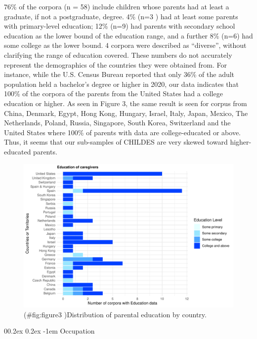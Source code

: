 \documentclass[
  man,floatsintext]{apa6}
\makeatletter
\let\oldparagraph\paragraph
\renewcommand{\paragraph}[1]{\oldparagraph{#1}\mbox{}}
\renewcommand{\paragraph}{\@startsection{paragraph}{4}{\parindent}%
  {0\baselineskip \@plus 0.2ex \@minus 0.2ex}%
  {-1em}%
  {\normalfont\normalsize\bfseries\itshape\typesectitle}}
\makeatother
\begin{document}
76\% of the corpora (n = 58) include children whose parents had at least a graduate, if not a postgraduate, degree. 4\% (n=3 ) had at least some parents with primary-level education; 12\% (n=9) had parents with secondary school education as the lower bound of the education range, and a further 8\% (n=6) had some college as the lower bound. 4 corpora were described as ``diverse'', without clarifying the range of education covered. These numbers do not accurately represent the demographics of the countries they were obtained from. For instance, while the U.S. Census Bureau reported that only 36\% of the adult population held a bachelor's degree or higher in 2020, our data indicates that 100\% of the corpora of the parents from the United States had a college education or higher. As seen in Figure 3, the same result is seen for corpus from China, Denmark, Egypt, Hong Kong, Hungary, Israel, Italy, Japan, Mexico, The Netherlands, Poland, Russia, Singapore, South Korea, Switzerland and the United States where 100\% of parents with data are college-educated or above. Thus, it seems that our sub-samples of CHILDES are very skewed toward higher-educated parents.

\begin{figure}
\centering
\includegraphics{CHILDES_short_files/figure-latex/figure3 -1.pdf}
\caption{(\#fig:figure3 )Distribution of parental education by country.}
\end{figure}

\hypertarget{occupation}{%
\paragraph{Occupation}\label{occupation}}
\end{document}
